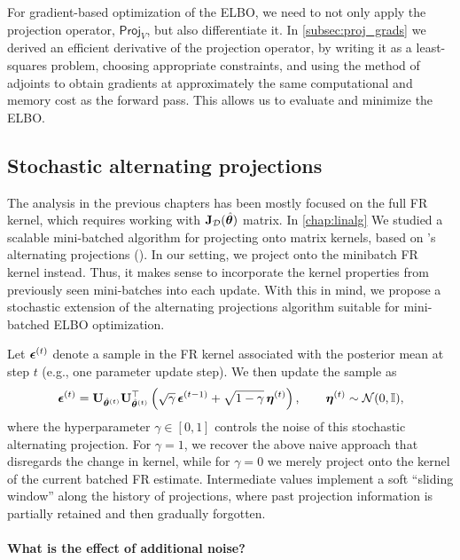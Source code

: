 For gradient-based optimization of the ELBO, we need to not only apply the projection operator, $\textsf{Proj}_V$, but also differentiate it. In \cref{subsec:proj_grads} we derived an efficient derivative of the projection operator, by writing it as a least-squares problem, choosing appropriate constraints, and using the method of adjoints to obtain gradients at approximately the same computational and memory cost as the forward pass. This allows us to evaluate and minimize the ELBO.

\subsection{Stochastic alternating projections}
\label{sec:stochastic-projection}
The analysis in the previous chapters has been mostly focused on the full FR kernel, which requires working with $\mathbf{J}_{\mathcal D}(\hat{\bm{\theta}}) $ matrix. In \cref{chap:linalg}
We studied a scalable mini-batched algorithm for projecting onto matrix kernels, based on \citeauthor{von1949rings}'s alternating projections (\citeyear{von1949rings}). In our setting, we project onto the minibatch FR kernel instead. Thus, it makes sense to incorporate the kernel properties from previously seen mini-batches into each update. With this in mind, we propose a stochastic extension of the alternating projections algorithm suitable for mini-batched ELBO optimization.

Let $\bm{\epsilon}^{(t)}$ denote a sample in the FR kernel associated with the posterior mean at step $t$ (e.g., one parameter update step).
We then update the sample as
\begin{align}\label{eq:altproj-process}
    \bm{\epsilon}^{(t)} = \mathbf{U}_{\hat{\bm{\theta}}^{(t)}}\mathbf{U}_{\hat{\bm{\theta}}^{(t)}}^{\top} \left(
        \sqrt{\gamma}\, \bm{\epsilon}^{(t-1)} + \sqrt{1 - \gamma}\, \bm{\eta}^{(t)}
    \right),
    \qquad \bm{\eta}^{(t)} \sim \mathcal{N}(0, \mathbb{I}),
\end{align}
where the hyperparameter $\gamma \in [0, 1]$ controls the noise of this stochastic alternating projection.
For $\gamma = 1$, we recover the above naive approach that disregards the change in kernel, while for $\gamma = 0$ we merely project onto the kernel of the current batched FR estimate.
Intermediate values implement a soft ``sliding window'' along the history of projections, where past projection information is partially retained and then gradually forgotten.

\paragraph{What is the effect of additional noise?}
%


